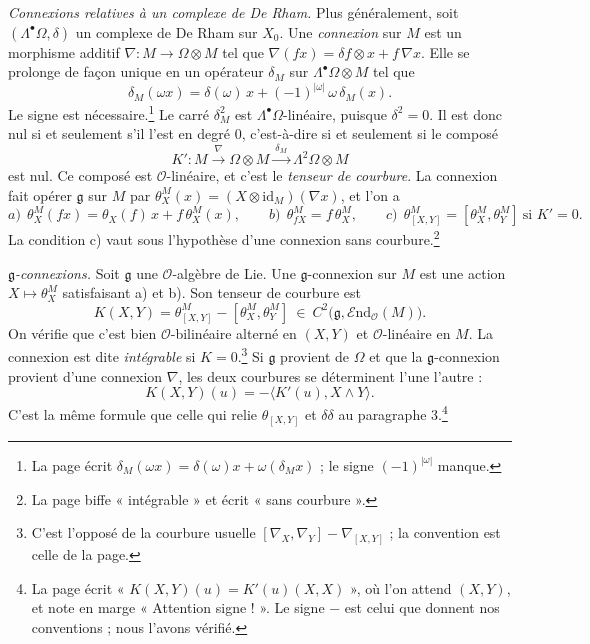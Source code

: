 \documentclass[11pt,a4paper]{article}
\begin{document}
\emph{Connexions relatives à un complexe de De Rham.} Plus généralement, soit
$(\Lambda^{\bullet}\Omega, \delta)$ un complexe de De Rham sur $X_0$. Une
\emph{connexion} sur $M$ est un morphisme additif $\nabla : M \to \Omega
\otimes M$ tel que $\nabla(fx) = \delta f \otimes x + f\,\nabla x$. Elle se
prolonge de façon unique en un opérateur $\delta_M$ sur
$\Lambda^{\bullet}\Omega \otimes M$ tel que
\[
\delta_M(\omega x) = \delta(\omega)\,x + (-1)^{|\omega|}\,\omega\,\delta_M(x).
\]
Le signe est nécessaire.\footnote{La page écrit $\delta_M(\omega x) =
\delta(\omega)x + \omega(\delta_M x)$ ; le signe $(-1)^{|\omega|}$ manque.}
Le carré $\delta_M^{2}$ est $\Lambda^{\bullet}\Omega$-linéaire, puisque
$\delta^{2} = 0$. Il est donc nul si et seulement s'il l'est en degré 0,
c'est-à-dire si et seulement si le composé
\[
K' : M \xrightarrow{\ \nabla\ } \Omega \otimes M \xrightarrow{\ \delta_M\ } \Lambda^{2}\Omega \otimes M
\]
est nul. Ce composé est $\mathcal{O}$-linéaire, et c'est le \emph{tenseur de
courbure}. La connexion fait opérer $\mathfrak{g}$ sur $M$ par
$\theta^{M}_X(x) = (X \otimes \mathrm{id}_M)(\nabla x)$, et l'on a
\[
a)\ \ \theta^{M}_X(fx) = \theta_X(f)\,x + f\,\theta^{M}_X(x),
\qquad
b)\ \ \theta^{M}_{fX} = f\,\theta^{M}_X ,
\qquad
c)\ \ \theta^{M}_{[X,Y]} = [\theta^{M}_X, \theta^{M}_Y] \ \text{si } K' = 0 .
\]
La condition c) vaut sous l'hypothèse d'une connexion sans
courbure.\footnote{La page biffe « intégrable » et écrit « sans courbure ».}

\emph{$\mathfrak{g}$-connexions.} Soit $\mathfrak{g}$ une
$\mathcal{O}$-algèbre de Lie. Une $\mathfrak{g}$-connexion sur $M$ est une
action $X \mapsto \theta^{M}_X$ satisfaisant a) et b). Son tenseur de courbure
est
\[
K(X,Y) = \theta^{M}_{[X,Y]} - [\theta^{M}_X, \theta^{M}_Y]
\ \in\ C^{2}\big(\mathfrak{g}, \mathcal{E}\mathrm{nd}_{\mathcal{O}}(M)\big).
\]
On vérifie que c'est bien $\mathcal{O}$-bilinéaire alterné en $(X,Y)$ et
$\mathcal{O}$-linéaire en $M$. La connexion est dite \emph{intégrable} si $K =
0$.\footnote{C'est l'opposé de la courbure usuelle $[\nabla_X, \nabla_Y] -
\nabla_{[X,Y]}$ ; la convention est celle de la page.} Si $\mathfrak{g}$
provient de $\Omega$ et que la $\mathfrak{g}$-connexion provient d'une
connexion $\nabla$, les deux courbures se déterminent l'une l'autre :
\[
K(X,Y)(u) = -\langle K'(u), X \wedge Y \rangle .
\]
C'est la même formule que celle qui relie $\theta_{[X,Y]}$ et $\delta\delta$
au paragraphe 3.\footnote{La page écrit « $K(X,Y)(u) = K'(u)(X,X)$ », où l'on
attend $(X,Y)$, et note en marge « Attention signe ! ». Le signe $-$ est celui
que donnent nos conventions ; nous l'avons vérifié.}
\end{document}
